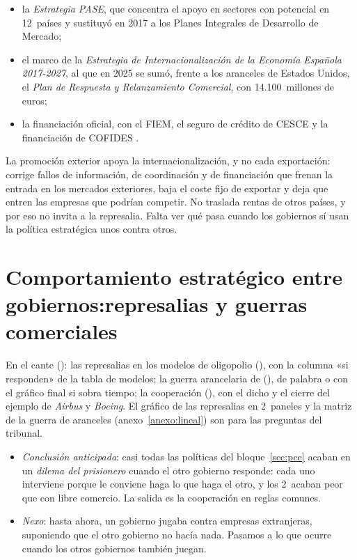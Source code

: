 \documentclass[11pt]{article}
\begin{document}
\begin{itemize}
\begin{itemize}
  \item la \emph{Estrategia PASE}, que concentra el apoyo en sectores con potencial en 12~países y sustituyó en 2017 a los Planes Integrales de Desarrollo de Mercado\nocite{SEC2026PASE,SEC2017Estrategia};
  \item el marco de la \emph{Estrategia de Internacionalización de la Economía Española 2017-2027}, al que en 2025 se sumó, frente a los aranceles de Estados Unidos, el \emph{Plan de Respuesta y Relanzamiento Comercial}, con 14.100~millones de euros\nocite{Moncloa2025PlanRespuesta,BOE2025RDL4};
  \item la financiación oficial, con el FIEM, el seguro de crédito de CESCE y la financiación de COFIDES .
  \end{itemize}
\end{itemize}

\begin{ideaclave}
La promoción exterior apoya la internacionalización, y no cada exportación: corrige fallos de información, de coordinación y de financiación que frenan la entrada en los mercados exteriores, baja el coste fijo de exportar y deja que entren las empresas que podrían competir. No traslada rentas de otros países, y por eso no invita a la represalia. Falta ver qué pasa cuando los gobiernos sí usan la política estratégica unos contra otros.
\end{ideaclave}

\section{Comportamiento estratégico entre gobiernos:\newline represalias y guerras comerciales}\label{sec:gobiernos}

\begin{notaopositor}
En el cante (): las represalias en los modelos de oligopolio (), con la columna «si responden» de la tabla de modelos; la guerra arancelaria de  (), de palabra o con el gráfico final si sobra tiempo; la cooperación (), con el dicho y el cierre del ejemplo de \emph{Airbus} y \emph{Boeing}. El gráfico de las represalias en 2~paneles y la matriz de la guerra de aranceles (anexo~\ref{anexo:lineal}) son para las preguntas del tribunal.
\end{notaopositor}

\begin{itemize}
\item \emph{Conclusión anticipada}: casi todas las políticas del bloque~\ref{sec:pce} acaban en un \emph{dilema del prisionero} cuando el otro gobierno responde: cada uno interviene porque le conviene haga lo que haga el otro, y los 2~acaban peor que con libre comercio. La salida es la cooperación en reglas comunes.
\item \emph{Nexo}: hasta ahora, un gobierno jugaba contra empresas extranjeras, suponiendo que el otro gobierno no hacía nada. Pasamos a lo que ocurre cuando los otros gobiernos también juegan.
\end{itemize}
\end{document}
